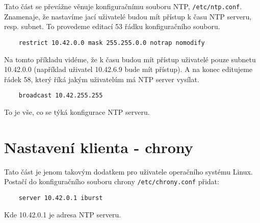     Tato část se převážne věnuje konfiguračnímu souboru NTP, \verb|/etc/ntp.conf|.
    Znamenaje, že nastavíme jací uživatelé budou mít přístup k času NTP serveru, resp.
    subnet. To provedeme editací 53 řádku konfiguračního souboru.

    \begin{lstlisting}
    restrict 10.42.0.0 mask 255.255.0.0 notrap nomodify
    \end{lstlisting}

    Na tomto příkladu vidéme, že k času budou mít přístup uživatelé pouze subnetu
    10.42.0.0 (například uživatel 10.42.6.9 bude mít přístup). A na konec editujeme řádek
    58, který říká jakým uživatelúm má NTP server vysílat.

    \begin{lstlisting}
    broadcast 10.42.255.255
    \end{lstlisting}

    \noindent To je vše, co se týká konfigurace NTP serveru.

\section{Nastavení klienta - chrony}

    Tato část je jenom takovým dodatkem pro uživatele operačního systému Linux. Postačí do
    konfiguračního souboru chrony \verb|/etc/chrony.conf| přidat:

    \begin{lstlisting}
    server 10.42.0.1 iburst
    \end{lstlisting}

    \noindent Kde 10.42.0.1 je adresa NTP serveru.
